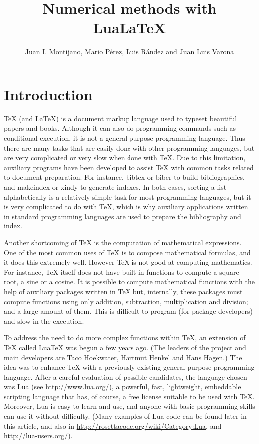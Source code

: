\documentclass{pracjourn}[2006/02/20]
\title{Numerical methods with Lua\LaTeX}
\author{Juan I. Montijano, Mario P\'erez, Luis R\'andez and Juan Luis Varona}
\begin{document}

\maketitle


\section*{Introduction}

\TeX{} (and \LaTeX{}) is a document markup language used to typeset beautiful papers and books.
Although it can also do programming commands such as conditional execution, it is not a general purpose programming language.  Thus there are many tasks that are 
easily done with other programming languages, but are very complicated or very slow when done with \TeX.
Due to this limitation, auxiliary programs have been developed to assist \TeX{} with common tasks related to document preparation. For instance, \textsf{bibtex} or \textsf{biber} to build bibliographies,  and \textsf{makeindex} or \textsf{xindy} to generate indexes.
In both cases, sorting a list alphabetically is a relatively simple task for most programming languages,  but it is very complicated to do with \TeX{}, which is why auxiliary applications written in standard programming languages are used to prepare the bibliography and index.

Another shortcoming of \TeX{} is the computation of mathematical expressions.
One of the most common uses of \TeX{} is to compose mathematical formulas, and it does this extremely well.
However \TeX{} is not good at computing mathematics. 
For instance, \TeX{} itself does not have built-in functions to compute a square root, a sine or a cosine. 
It is possible to compute mathematical functions with the help of auxiliary packages written in \TeX{} but, internally, these packages must compute functions using only addition, subtraction, multiplication and division; and a large amount of them. This is difficult to program (for package developers) and slow in the execution.

To address the need to do more complex functions within \TeX, an extension of \TeX{} called Lua\TeX{} was begun a few years ago.  
(The leaders of the project and main developers are Taco Hoekwater, Hartmut Henkel and Hans Hagen.) The idea was to enhance \TeX{} with a previously existing general purpose programming language. After a careful evaluation of possible candidates, the language chosen was Lua (see \url{http://www.lua.org/}), a powerful, fast, lightweight, embeddable scripting language that has,  of course, a free license suitable to be used with \TeX.
Moreover, Lua is easy to learn and use, and anyone with basic programming skills can use it without difficulty. (Many examples of Lua code can be found later in this article, and also in \url{http://rosettacode.org/wiki/Category:Lua},
and \url{http://lua-users.org/}).
\end{document}
